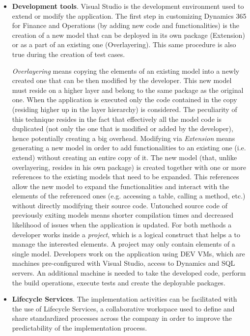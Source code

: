 \begin{itemize}
    \item \textbf{Development tools}. Visual Studio is the development environment used to extend or modify the application. The first step in customizing Dynamics 365 for Finance and Operations (by adding new code and functionalities) is the creation of a new model that can be deployed in its own package (Extension) or as a part of an existing one (Overlayering). This same procedure is also true during the creation of test cases.
    
    \textit{Overlayering} means copying the elements of an existing model into a newly created one that can be then modified by the developer. This new model must reside on a higher layer and belong to the same package as the original one. When the application is executed only the code contained in the copy (residing higher up in the layer hierarchy) is considered. The peculiarity of this technique resides in the fact that effectively all the model code is duplicated (not only the one that is modified or added by the developer), hence potentially creating a big overhead. Modifying via \textit{Extension} means generating a new model in order to add functionalities to an existing one (i.e. extend) without creating an entire copy of it. The new model (that, unlike overlayering, resides in his own package) is created together with one or more references to the existing models that need to be expanded. This references allow the new model to expand the functionalities and interact with the elements of the referenced ones (e.g. accessing a table, calling a method, etc.) without directly modifying their source code. Untouched source code of previously exiting models means shorter compilation times and decreased likelihood of issues when the application is updated. For both methods a developer works inside a \textit{project}, which is a logical construct that helps a to manage the interested elements. A project may only contain elements of a single model. Developers work on the application using DEV VMs, which are machines pre-configured with Visual Studio, access to Dynamics and SQL servers. An additional machine is needed to take the developed code, perform the build operations, execute tests and create the deployable packages.
    
    \item \textbf{Lifecycle Services}. The implementation activities can be facilitated with the use of Lifecycle Services, a collaborative workspace used to define and share standardized processes across the company in order to improve the predictability of the implementation process.
\end{itemize}

